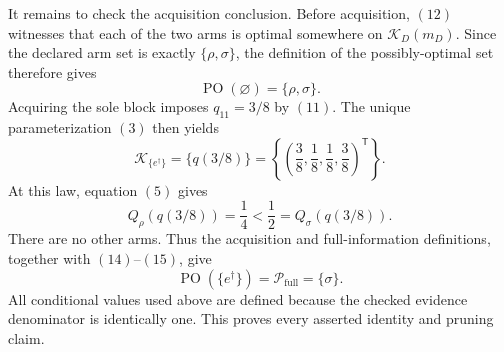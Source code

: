 It remains to check the acquisition conclusion.  Before acquisition, \((12)\) witnesses that each of the two arms is optimal somewhere on \(\mathcal K_D(m_D)\).  Since the declared arm set is exactly \(\{\rho,\sigma\}\), the definition of the possibly-optimal set therefore gives
\[
\operatorname{PO}(\varnothing)=\{\rho,\sigma\}.
\tag{13}
\]
Acquiring the sole block imposes \(q_{11}=3/8\) by \((11)\).  The unique parameterization \((3)\) then yields
\[
\mathcal K_{\{e^\dagger\}}
=\{q(3/8)\}
=\left\{\left(\frac38,\frac18,\frac18,\frac38\right)^{\mathsf T}\right\}.
\tag{14}
\]
At this law, equation \((5)\) gives
\[
Q_\rho(q(3/8))=\frac14<\frac12=Q_\sigma(q(3/8)).
\tag{15}
\]
There are no other arms.  Thus the acquisition and full-information definitions, together with \((14)\)--\((15)\), give
\[
\operatorname{PO}(\{e^\dagger\})
=\mathcal P_{\mathrm{full}}
=\{\sigma\}.
\]
All conditional values used above are defined because the checked evidence denominator is identically one.  This proves every asserted identity and pruning claim.